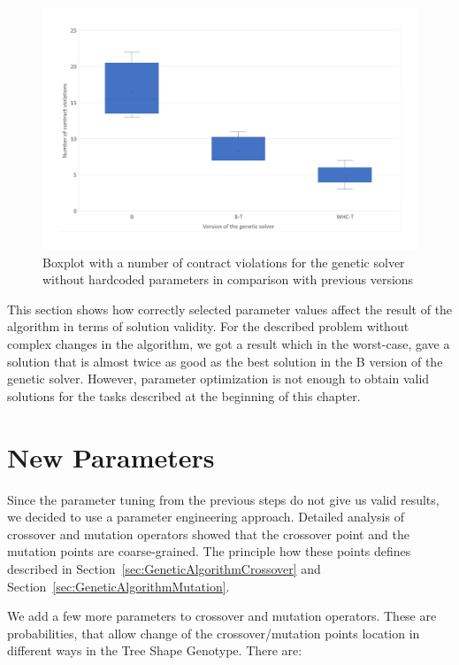 \begin{figure}
	\centering
	\includegraphics[width=\textwidth]{images/BoxPlotSolverNoHardcodedTuning.pdf}
	\caption[Boxplot with a number of contract violations for the genetic solver without hardcoded parameters in comparison with previous versions]{Boxplot with a number of contract violations for the genetic solver without hardcoded parameters in comparison with previous versions}
	\label{fig:boxplotsolverNoHardcodedTuning}
\end{figure}

This section shows how correctly selected parameter values affect the result of the algorithm in terms of solution validity. For the described problem without complex changes in the algorithm, we got a result which in the worst-case, gave a solution that is almost twice as good as the best solution in the B version of the genetic solver. However, parameter optimization is not enough to obtain valid solutions for the tasks described at the beginning of this chapter. 

\section{New Parameters}\label{sec:NP}

Since the parameter tuning from the previous steps do not give us valid results, we decided to use a parameter engineering approach.
Detailed analysis of crossover and mutation operators showed that the crossover point and the mutation points are coarse-grained. The principle how these points defines described in Section~\ref{sec:GeneticAlgorithmCrossover} and Section~\ref{sec:GeneticAlgorithmMutation}.

We add a few more parameters to crossover and mutation operators. These are probabilities, that allow change of the crossover/mutation points location in different ways in the Tree Shape Genotype.
There are:
